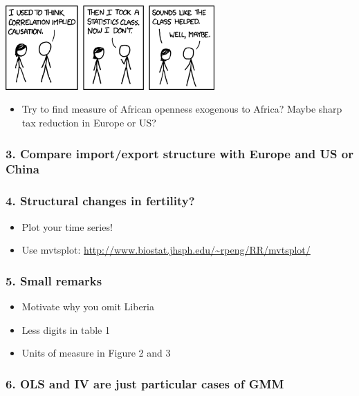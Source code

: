\documentclass[english,]{article}
\providecommand{\tightlist}{%
  \setlength{\itemsep}{0pt}\setlength{\parskip}{0pt}}
\begin{document}
\includegraphics[width=8cm]{correlation.png}

\begin{itemize}
\tightlist
\item
  Try to find measure of African openness exogenous to Africa? Maybe
  sharp tax reduction in Europe or US?
\end{itemize}

\subsubsection{3. Compare import/export structure with Europe and US or
China}\label{compare-importexport-structure-with-europe-and-us-or-china}

\subsubsection{4. Structural changes in
fertility?}\label{structural-changes-in-fertility}

\begin{itemize}
\item
  Plot your time series!
\item
  Use mvtsplot: \url{http://www.biostat.jhsph.edu/~rpeng/RR/mvtsplot/}
\end{itemize}

\subsubsection{5. Small remarks}\label{small-remarks}

\begin{itemize}
\item
  Motivate why you omit Liberia
\item
  Less digits in table 1
\item
  Units of measure in Figure 2 and 3
\end{itemize}

\subsubsection{6. OLS and IV are just particular cases of
GMM}\label{ols-and-iv-are-just-particular-cases-of-gmm}
\end{document}
